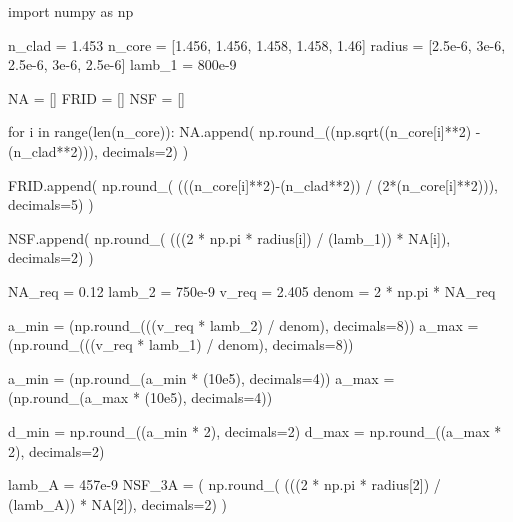 \documentclass[colorlinks,11pt,a4paper,normalphoto,withhyper,ragged2e]{altareport}
\begin{document}
\newpage


\begin{pycode}
import numpy as np

n_clad = 1.453
n_core = [1.456, 1.456, 1.458, 1.458, 1.46]
radius = [2.5e-6, 3e-6, 2.5e-6, 3e-6, 2.5e-6]
lamb_1 = 800e-9

NA = []
FRID = []
NSF = []
    
for i in range(len(n_core)):
	NA.append( np.round_((np.sqrt((n_core[i]**2) - (n_clad**2))), decimals=2) )
	
	FRID.append( np.round_( (((n_core[i]**2)-(n_clad**2)) / (2*(n_core[i]**2))), decimals=5) )
	
	NSF.append( np.round_( (((2 * np.pi * radius[i]) / (lamb_1)) * NA[i]), decimals=2) )


NA_req = 0.12
lamb_2 = 750e-9
v_req = 2.405
denom = 2 * np.pi * NA_req

a_min = (np.round_(((v_req * lamb_2) / denom), decimals=8))
a_max = (np.round_(((v_req * lamb_1) / denom), decimals=8))

a_min = (np.round_(a_min * (10e5), decimals=4))
a_max = (np.round_(a_max * (10e5), decimals=4))

d_min = np.round_((a_min * 2), decimals=2)
d_max = np.round_((a_max * 2), decimals=2)


lamb_A = 457e-9
NSF_3A = ( np.round_( (((2 * np.pi * radius[2]) / (lamb_A)) * NA[2]), decimals=2) )
\end{pycode}
\end{document}
